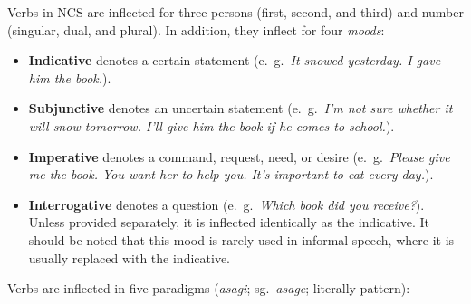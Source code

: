\documentclass{book}
\begin{document}
Verbs in NCS are inflected for three persons (first, second, and third) and number (singular, dual, and plural). In addition, they inflect for four \emph{moods}:

\begin{itemize}
  \item \textbf{Indicative} denotes a certain statement (e.~g.~\emph{It snowed yesterday. I gave him the book.}).
  \item \textbf{Subjunctive} denotes an uncertain statement (e.~g.~\emph{I'm not sure whether it will snow tomorrow. I'll give him the book if he \emph{comes to school}.}).
  \item \textbf{Imperative} denotes a command, request, need, or desire (e.~g.~\emph{Please give me the book. You want her to help you. It's important to eat every day.}).
  \item \textbf{Interrogative} denotes a question (e.~g.~\emph{Which book did you receive?}). Unless provided separately, it is inflected identically as the indicative. It should be noted that this mood is rarely used in informal speech, where it is usually replaced with the indicative.
\end{itemize}

\newpage

Verbs are inflected in five paradigms (\emph{asagi}; sg.~\emph{asage}; literally pattern): \\
\end{document}
